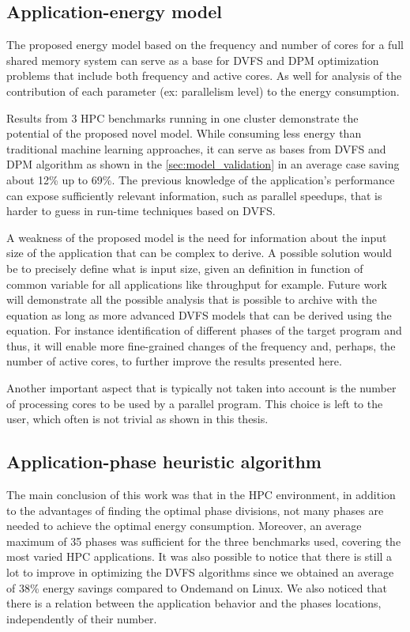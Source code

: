 \subsection{Application-energy model} \label{sec:conclusion_models}

The proposed energy model based on the frequency and number of cores for a full shared memory system can serve as a base for DVFS and DPM optimization problems that include both frequency and active cores. As well for analysis of the contribution of each parameter (ex: parallelism level) to the energy consumption.

Results from 3 HPC benchmarks running in one cluster demonstrate the potential of the proposed novel model. While consuming less energy than traditional machine learning approaches, it can serve as bases from DVFS and DPM algorithm as shown in the \ref{sec:model_validation} in an average case saving about 12\% up to 69\%. The previous knowledge of the application's performance can expose sufficiently relevant information, such as parallel speedups, that is harder to guess in run-time techniques based on DVFS.

A weakness of the proposed model is the need for information about the input size of the application that can be complex to derive. A possible solution would be to precisely define what is input size, given an definition in function of common variable for all applications like throughput for example. Future work will demonstrate all the possible analysis that is possible to archive with the equation as long as more advanced DVFS models that can be derived using the equation. For instance identification of different phases of the target program and thus, it will enable more fine-grained changes of the frequency and, perhaps, the number of active cores, to further improve the results presented here.

Another important aspect that is typically not taken into account is the number of processing cores to be used by a parallel program. This choice is left to the user, which often is not trivial as shown in this thesis.

\subsection{Application-phase heuristic algorithm} \label{sec:phases_conclusion}
The main conclusion of this work was that in the HPC environment, in addition to the advantages of finding the optimal phase divisions, not many phases are needed to achieve the optimal energy consumption. Moreover, an average maximum of 35 phases was sufficient for the three benchmarks used, covering the most varied HPC applications.
It was also possible to notice that there is still a lot to improve in optimizing the DVFS algorithms since we obtained an average of 38\% energy savings compared to Ondemand on Linux.
We also noticed that there is a relation between the application behavior and the phases locations, independently of their number.


